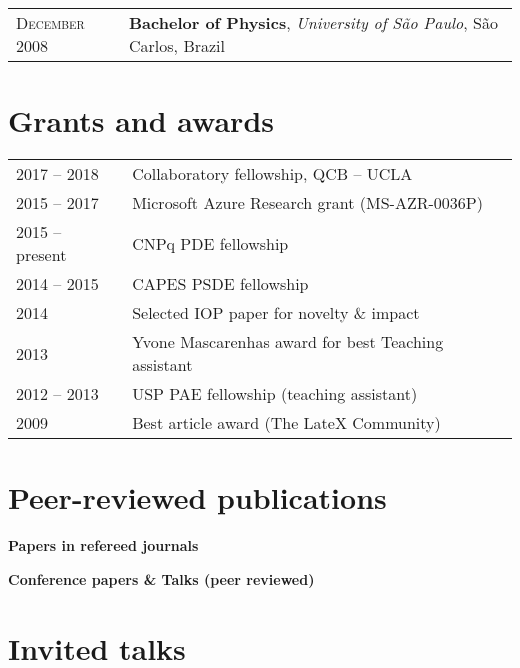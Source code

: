 \documentclass[letter,10pt]{article} %
\begin{document}
\begin{tabular}{p{3.2cm}|p{11cm}}
  \textsc{December} 2008 & {\bf Bachelor of Physics},
  \textit{University of S\~ao Paulo}, S\~ao Carlos, Brazil \\
\end{tabular}


\section{Grants and awards}

\renewcommand*{\arraystretch}{1.2}

\begin{longtable}{p{2.5cm}p{15cm}}
  2017 -- 2018  & Collaboratory fellowship, QCB -- UCLA \\
  2015 -- 2017  & Microsoft Azure Research grant (MS-AZR-0036P) \\
  2015 -- present  & CNPq PDE fellowship \\
  2014 -- 2015   & CAPES PSDE fellowship \\
  2014   & Selected IOP paper for novelty \& impact \\
  2013   & Yvone Mascarenhas award for best Teaching assistant \\
  2012 -- 2013 & USP PAE fellowship (teaching assistant) \\
  2009   & Best article award (The LateX Community)
\end{longtable}


\section{Peer-reviewed publications}

\nocite{*}

{\bf Papers in refereed journals}
\printbibliography[type=article]

{\bf Conference papers \& Talks (peer reviewed)}
\printbibliography[type=inproceedings]


\section{Invited talks}
\end{document}
